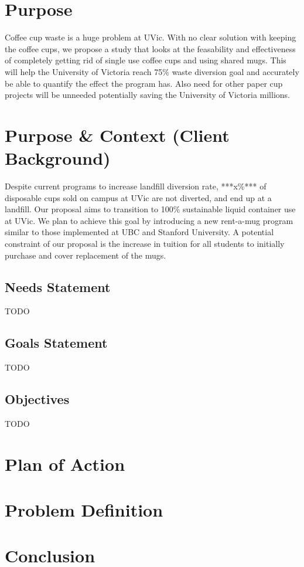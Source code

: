 \documentclass[letterpaper,11pt]{texMemo} %
\begin{document}
\maketitle %


\section*{Purpose}
Coffee cup waste is a huge problem at UVic. With no clear solution with keeping the coffee cups, we
propose a study that looks at the feasability and effectiveness of completely getting rid of single
use coffee cups and using shared mugs. This will help the University of Victoria reach 75\% waste 
diversion goal and accurately be able to quantify the effect the program has. Also need for other 
paper cup projects will be unneeded potentially saving the University of Victoria millions.
\section*{Purpose & Context (Client Background)}
Despite current programs to increase landfill diversion rate, ***x\%*** of
disposable cups sold on campus at UVic are not diverted, and end up at a landfill.
Our proposal aims to transition to 100\% sustainable liquid container use at UVic.
We plan to achieve this goal by introducing a new rent-a-mug program similar to
those implemented at UBC and Stanford University. A potential constraint of
our proposal is the increase in tuition for all students to initially purchase
and cover replacement of the mugs.
\subsection {Needs Statement}
TODO
\subsection {Goals Statement}
TODO
\subsection {Objectives}
TODO
\section*{Plan of Action}
\section {Problem Definition}


\section*{Conclusion}

\end{document}
